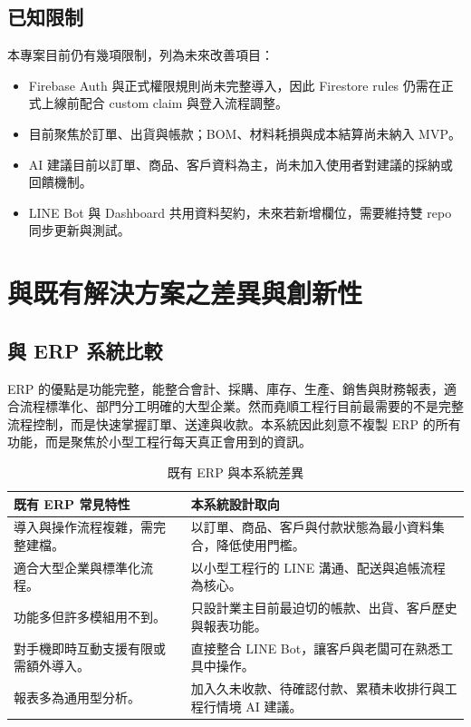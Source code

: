 \documentclass[12pt,a4paper,UTF8,fontset=none]{ctexart}
\begin{document}
\subsection{已知限制}

本專案目前仍有幾項限制，列為未來改善項目：

\begin{itemize}
  \item Firebase Auth 與正式權限規則尚未完整導入，因此 Firestore rules 仍需在正式上線前配合 custom claim 與登入流程調整。
  \item 目前聚焦於訂單、出貨與帳款；BOM、材料耗損與成本結算尚未納入 MVP。
  \item AI 建議目前以訂單、商品、客戶資料為主，尚未加入使用者對建議的採納或回饋機制。
  \item LINE Bot 與 Dashboard 共用資料契約，未來若新增欄位，需要維持雙 repo 同步更新與測試。
\end{itemize}

\section{與既有解決方案之差異與創新性}

\subsection{與 ERP 系統比較}

ERP 的優點是功能完整，能整合會計、採購、庫存、生產、銷售與財務報表，適合流程標準化、部門分工明確的大型企業。然而堯順工程行目前最需要的不是完整流程控制，而是快速掌握訂單、送達與收款。本系統因此刻意不複製 ERP 的所有功能，而是聚焦於小型工程行每天真正會用到的資訊。

\begin{table}[H]
  \centering
  \caption{既有 ERP 與本系統差異}
  \begin{tabularx}{\textwidth}{L{4cm}Y}
    \toprule
    既有 ERP 常見特性 & 本系統設計取向 \\
    \midrule
    導入與操作流程複雜，需完整建檔。 & 以訂單、商品、客戶與付款狀態為最小資料集合，降低使用門檻。 \\
    適合大型企業與標準化流程。 & 以小型工程行的 LINE 溝通、配送與追帳流程為核心。 \\
    功能多但許多模組用不到。 & 只設計業主目前最迫切的帳款、出貨、客戶歷史與報表功能。 \\
    對手機即時互動支援有限或需額外導入。 & 直接整合 LINE Bot，讓客戶與老闆可在熟悉工具中操作。 \\
    報表多為通用型分析。 & 加入久未收款、待確認付款、累積未收排行與工程行情境 AI 建議。 \\
    \bottomrule
  \end{tabularx}
\end{table}
\end{document}
